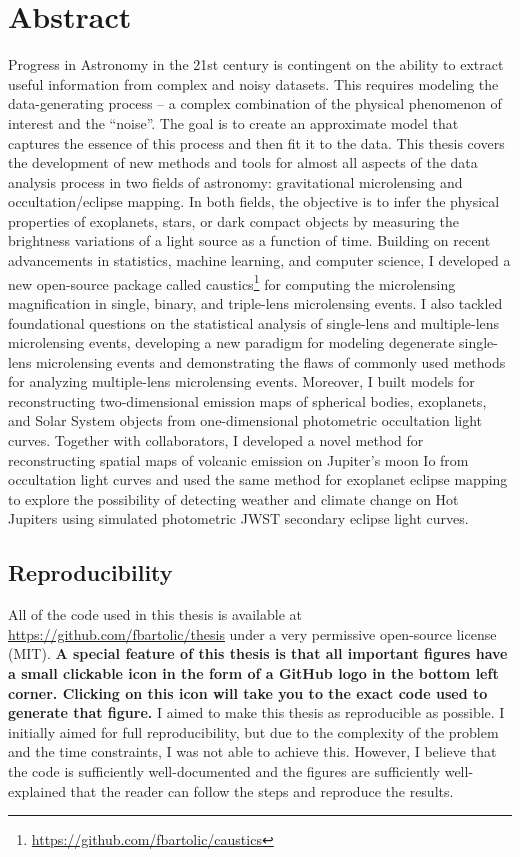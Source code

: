 \documentclass[12pt,dvipsnames]{report}
\newcommand{\ssf}[1]{\textsf{#1}}
\begin{document}
\chapter*{Abstract}
Progress in Astronomy in the 21st century is contingent on the ability to extract useful information 
from complex and noisy datasets. This requires modeling the data-generating 
process -- a complex combination of the physical phenomenon of interest and the ``noise''. 
The goal is to create an approximate model that captures the essence of this process and 
then fit it to the data. This thesis covers the development of new methods and tools 
for almost all aspects of the data analysis process in two fields of astronomy: 
gravitational microlensing and occultation/eclipse mapping. 
In both fields, the objective is to infer the physical properties of exoplanets, stars, or dark 
compact objects by measuring the brightness variations of a light source as a function of time. 
Building on recent advancements in statistics, machine learning, and computer science, I developed a new open-source 
package called \ssf{caustics}\footnote{\url{https://github.com/fbartolic/caustics}} for computing the microlensing magnification 
in single, binary, and triple-lens microlensing events.
 I also tackled foundational questions on the statistical analysis of single-lens and multiple-lens microlensing 
 events, developing a new paradigm for modeling degenerate single-lens microlensing events and demonstrating the flaws 
 of commonly used methods for analyzing multiple-lens microlensing events.
Moreover, I built models for reconstructing two-dimensional emission maps of spherical bodies, exoplanets, 
and Solar System objects from one-dimensional photometric occultation light curves. 
Together with collaborators, I developed a novel method for reconstructing spatial maps of volcanic emission on Jupiter's moon Io from 
occultation light curves and used the same method for exoplanet eclipse mapping to explore the possibility of 
detecting weather and climate change on Hot Jupiters using simulated photometric JWST secondary eclipse light curves. 

\newpage
\thispagestyle{empty}

\newpage
\thispagestyle{empty}
\section*{Reproducibility}
All of the code used in this thesis is available at \url{https://github.com/fbartolic/thesis} 
under a very permissive open-source license (MIT). \textbf{A special feature of this thesis 
is that all important figures have a small clickable icon in the form of a GitHub logo in the bottom 
left corner. Clicking on this icon will take you to the exact code used to generate that 
figure.} I aimed to make this thesis as reproducible as possible. I initially aimed for 
full reproducibility, but due to the complexity of the problem and the time constraints,
I was not able to achieve this. However, I believe that the code is sufficiently well-documented
and the figures are sufficiently well-explained that the reader can follow the steps and
reproduce the results. 
\end{document}
